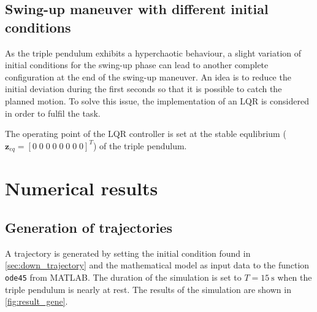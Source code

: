 \documentclass[a4paper,12pt]{article}
\begin{document}
\subsection{Swing-up maneuver with different initial conditions}
As the triple pendulum exhibits a hyperchaotic behaviour, a slight variation of initial conditions for the swing-up phase can lead to another complete configuration at the end of the swing-up maneuver. An idea is to reduce the initial deviation during the first seconds so that it is possible to catch the planned motion. To solve this issue, the implementation of an LQR is considered in order to fulfil the task.

The operating point of the LQR controller is set at the stable equlibrium ($\mathbf{z}_{eq}=[0\;0\;0\;0\;0\;0\;0\;0]^T$) of the triple pendulum. 



\section{Numerical results}
\subsection{Generation of trajectories}
A trajectory is generated by setting the initial condition found in \autoref{sec:down_trajectory} and the mathematical model as input data to the function \texttt{ode45} from MATLAB. The duration of the simulation is set to $T=\SI{15}{\second}$ when the triple pendulum is nearly at rest. The results of the simulation are shown in \autoref{fig:result_gene}.
\end{document}

